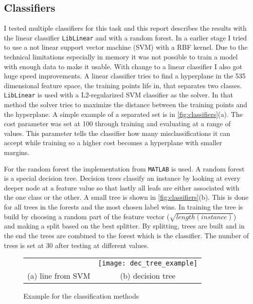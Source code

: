\subsection{Classifiers} %
\label{sub:classifiers}
I tested multiple classifiers for this task and this report describes the results with the linear classifier \texttt{LibLinear}\cite{liblinear} and with a random forest\cite{randforest}.
In a earlier stage I tried to use a not linear support vector machine (SVM) with a RBF kernel. Due to the technical limitations especially in memory it was not possible to train a model with enough data to make it usable. With change to a linear classifier I also got huge speed improvements. A linear classifier tries to find a hyperplane in the 535 dimensional feature space, the training points life in, that separates two classes. \texttt{LibLinear} is used with a L2-regularized SVM classifier as the solver. In that method the solver tries to maximize the distance between the training points and the hyperplane. A simple example of a separated set is in \autoref{fig:classifiers}(a). The cost parameter was set at 100 through training and evaluating at a range of values. This parameter tells the classifier how many misclassifications it can accept while training so a higher cost becomes a hyperplane with smaller margins.

For the random forest the implementation from \texttt{MATLAB} is used. A random forest is a special decision tree. Decision trees classify an instance by looking at every deeper node at a feature value so that lastly all leafs are either associated with the one class or the other. A small tree is shown in \autoref{fig:classifiers}(b). This is done for all trees in the forests and the most chosen label wins. In training the tree is build by choosing a random part of the feature vector ($\sqrt{length(instance)}$) and making a split based on the best splitter. By splitting, trees are built and in the end the trees are combined to the forest which is the classifier. The number of trees is set at 30 after testing at different values.
\begin{figure}
	\centering
	\footnotesize
	\begin{tabular}{c c}
		\raisebox{-.18\height}{\texttt{[image: svm\_example]}} &
		\texttt{[image: dec\_tree\_example]} \\
		(a) line from SVM & (b) decision tree
	\end{tabular}
	\caption{Example for the classification methods}
	\label{fig:classifiers}
\end{figure}

